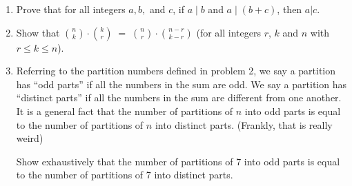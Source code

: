 \documentclass{amsart}
\begin{document}
\begin{enumerate}
\item Prove that for all integers $a, b,$ and $c$, if $a \mid b$ and $a \mid (b+c)$, then
$a|c$.

\vfill

\item Show that $\binom{n}{k} \cdot \binom{k}{r} \; = \; \binom{n}{r} \cdot \binom{n-r}{k-r}$ (for all integers $r$, $k$ and $n$ with $r \leq k \leq n$). 

\vfill

\newpage

\item Referring to the partition numbers defined in problem 2, we say a partition has ``odd parts'' if all the numbers in the sum are odd.  We say a partition has ``distinct parts'' if all the numbers in the sum are different from one another.  It is a general fact that the number of partitions of $n$ into odd parts is equal to the number of partitions of $n$ into distinct parts. 
(Frankly, that is really weird\textellipsis)

Show exhaustively that the number of partitions of 7 into odd parts is equal to the number of partitions of 7 into distinct parts.

\vfill

\end{enumerate}
\end{document}
